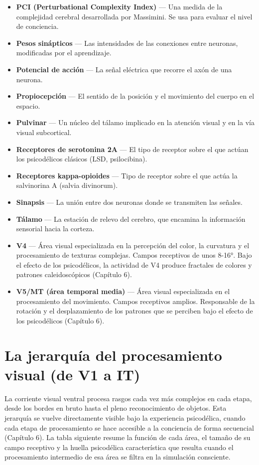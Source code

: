 \documentclass[11pt, twoside, openright]{book}
\begin{document}
\begin{itemize}
  \item \textbf{PCI (Perturbational Complexity Index)} --- Una medida de la complejidad cerebral desarrollada por Massimini. Se usa para evaluar el nivel de conciencia.
  \item \textbf{Pesos sinápticos} --- Las intensidades de las conexiones entre neuronas, modificadas por el aprendizaje.
  \item \textbf{Potencial de acción} --- La señal eléctrica que recorre el axón de una neurona.
  \item \textbf{Propiocepción} --- El sentido de la posición y el movimiento del cuerpo en el espacio.
  \item \textbf{Pulvinar} --- Un núcleo del tálamo implicado en la atención visual y en la vía visual subcortical.
  \item \textbf{Receptores de serotonina 2A} --- El tipo de receptor sobre el que actúan los psicodélicos clásicos (LSD, psilocibina).
  \item \textbf{Receptores kappa-opioides} --- Tipo de receptor sobre el que actúa la salvinorina A (salvia divinorum).
  \item \textbf{Sinapsis} --- La unión entre dos neuronas donde se transmiten las señales.
  \item \textbf{Tálamo} --- La estación de relevo del cerebro, que encamina la información sensorial hacia la corteza.
  \item \textbf{V4} --- Área visual especializada en la percepción del color, la curvatura y el procesamiento de texturas complejas. Campos receptivos de unos 8-16°. Bajo el efecto de los psicodélicos, la actividad de V4 produce fractales de colores y patrones caleidoscópicos (Capítulo 6).
  \item \textbf{V5/\allowbreak{}MT (área temporal media)} --- Área visual especializada en el procesamiento del movimiento. Campos receptivos amplios. Responsable de la rotación y el desplazamiento de los patrones que se perciben bajo el efecto de los psicodélicos (Capítulo 6).
\end{itemize}

\section*{La jerarquía del procesamiento visual (de V1 a IT)}

La corriente visual ventral procesa rasgos cada vez más complejos en cada etapa, desde los bordes en bruto hasta el pleno reconocimiento de objetos. Esta jerarquía se vuelve directamente visible bajo la experiencia psicodélica, cuando cada etapa de procesamiento se hace accesible a la conciencia de forma secuencial (Capítulo 6). La tabla siguiente resume la función de cada área, el tamaño de su campo receptivo y la huella psicodélica característica que resulta cuando el procesamiento intermedio de esa área se filtra en la simulación consciente.
\end{document}
